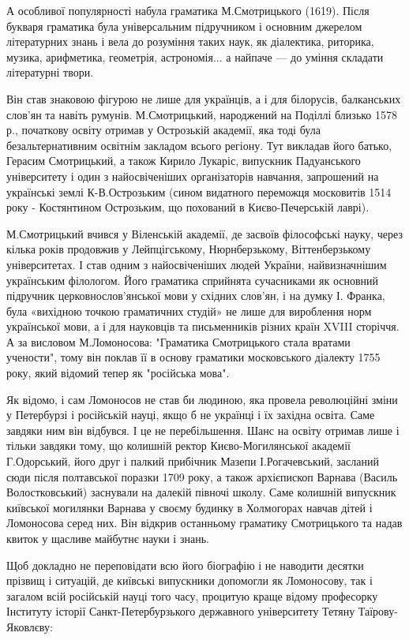 А особливої популярності набула граматика М.Смотрицького (1619). Після букваря
граматика була універсальним підручником і основним джерелом літературних знань
і вела до розуміння таких наук, як діалектика, риторика, музика, арифметика,
геометрія, астрономія... а найпаче — до уміння складати літературні твори. 

Він став знаковою фігурою не лише для українців, а і для білорусів, балканських
слов'ян та навіть румунів. М.Смотрицький, народжений на Поділлі близько 1578
р., початкову освіту отримав у Острозькій академії, яка тоді була
безальтернативним освітнім закладом всього регіону. Тут викладав його батько,
Герасим Смотрицький, а також Кирило Лукаріс, випускник Падуанського
університету і один з найосвіченіших організаторів навчання, запрошений на
українські землі К-В.Острозьким (сином видатного переможця московитів 1514 року
- Костянтином Острозьким, що похований в Києво-Печерській лаврі). 

М.Смотрицький вчився у Віленській академії, де засвоїв філософські науку, через
кілька років продовжив у Лейпцігському, Нюрнберзькому, Віттенберзькому
університетах. І став одним з найосвіченіших людей України, найвизначнішим
українським філологом. Його граматика сприйнята сучасниками як основний
підручник церковнослов'янської мови у східних слов'ян, і на думку І. Франка,
була «вихідною точкою граматичних студій» не лише для вироблення норм
української мови, а і для науковців та письменників різних країн XVIII
сторіччя. А за висловом М.Ломоносова: "Граматика Смотрицького стала вратами
учености", тому він поклав її в основу граматики московського діалекту 1755
року, який відомий тепер як "російська мова".

Як відомо, і сам Ломоносов не став би людиною, яка провела революційні зміни у
Петербурзі і російській науці, якщо б не українці і їх західна освіта. Саме
завдяки ним він відбувся. І це не перебільшення. Шанс на освіту отримав лише і
тільки завдяки тому, що колишній ректор Києво-Могилянської академії
Г.Одорський, його друг і палкий прибічник Мазепи І.Рогачевський, засланий сюди
після полтавської поразки 1709 року, а також архієпископ Варнава (Василь
Волостковський) заснували на далекій півночі школу. Саме колишній випускник
київської могилянки Варнава у своєму будинку в Холмогорах навчав дітей і
Ломоносова серед них. Він відкрив останньому граматику Смотрицького та надав
квиток у щасливе майбутнє науки і знань.

Щоб докладно не переповідати всю його біографію і не наводити десятки прізвищ і
ситуацій, де київські випускники допомогли як Ломоносову, так і загалом всій
російській науці того часу, процитую краще відому професорку Інституту історії
Санкт-Петербурзького державного університету Тетяну Таїрову-Яковлєву: 

